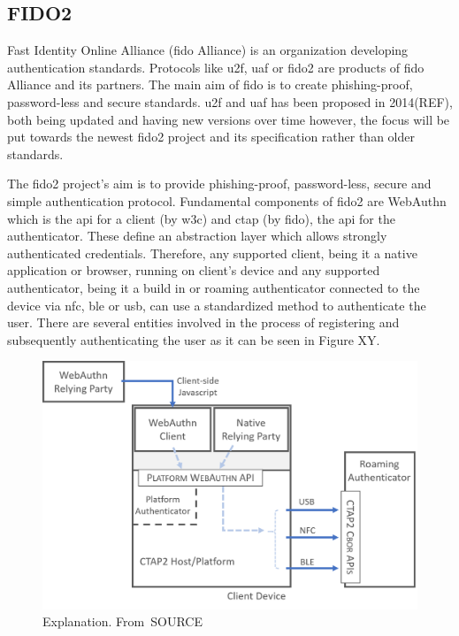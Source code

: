 \subsection{FIDO2}

Fast Identity Online Alliance (\acrshort{fido} Alliance) is an organization developing authentication standards. Protocols like \acrfull{u2f}, \acrfull{uaf} or \acrshort{fido}2 are products of \acrshort{fido} Alliance and its partners. The main aim of \acrshort{fido} is to create phishing-proof, password-less and secure standards. \acrshort{u2f} and \acrshort{uaf} has been proposed in 2014(REF), both being updated and having new versions over time however, the focus will be put towards the newest \acrshort{fido}2 project and its specification rather than older standards.

The \acrshort{fido}2 project’s aim is to provide phishing-proof, password-less, secure and simple authentication protocol. Fundamental components of \acrshort{fido}2 are WebAuthn which is the \acrshort{api} for a client (by \acrshort{w3c}) and \acrshort{ctap} (by \acrshort{fido}), the \acrshort{api} for the authenticator. These define an abstraction layer which allows strongly authenticated credentials. Therefore, any supported client, being it a native application or browser, running on client’s device and any supported authenticator, being it a build in or roaming authenticator connected to the device via \acrshort{nfc}, \acrshort{ble} or \acrshort{usb}, can use a standardized method to authenticate the user. There are several entities involved in the process of registering and subsequently authenticating the user as it can be seen in Figure XY.

\begin{figure}[ht]
    \centering
    \includegraphics[width=.95\textwidth]{00images/FIDO2_Overview.png}
    \caption{Explanation. From~\cite{}SOURCE}
    \label{fig:fido2_overview}
\end{figure}

